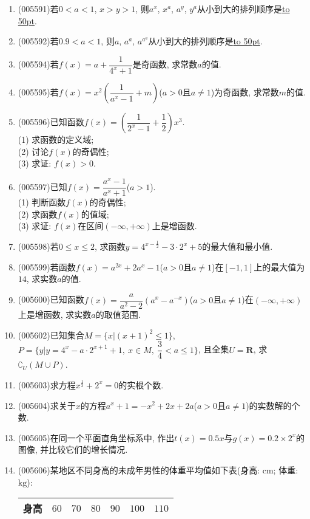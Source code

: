 \documentclass[10pt,a4paper]{article}
\newcommand{\blank}[1]{\underline{\hbox to #1pt{}}}
\begin{document}
\begin{enumerate}[1.]
\item {\tiny (005591)}若$0<a<1$, $x>y>1$, 则$a^x$, $x^a$, $a^y$, $y^a$从小到大的排列顺序是\blank{50}.
\item {\tiny (005592)}若$0.9<a<1$, 则$a$, $a^a$, $a^{a^a}$从小到大的排列顺序是\blank{50}.
\item {\tiny (005594)}若$f(x)=a+\dfrac 1{4^x+1}$是奇函数, 求常数$a$的值.
\item {\tiny (005595)}若$f(x)=x^2(\dfrac 1{a^x-1}+m)$($a>0$且$a\ne 1$)为奇函数, 求常数$m$的值.
\item {\tiny (005596)}已知函数$f(x)=(\dfrac 1{2^x-1}+\dfrac 12)x^3$.\\
(1) 求函数的定义域;\\
(2) 讨论$f(x)$的奇偶性;\\
(3) 求证: $f(x)>0$.
\item {\tiny (005597)}已知$f(x)=\dfrac{a^x-1}{a^x+1}$($a>1$).\\
(1) 判断函数$f(x)$的奇偶性;\\
(2) 求函数$f(x)$的值域;\\
(3) 求证: $f(x)$在区间$(-\infty ,+\infty)$上是增函数.
\item {\tiny (005598)}若$0\le x\le 2$, 求函数$y=4^{x-\frac 12}-3\cdot 2^x+5$的最大值和最小值.
\item {\tiny (005599)}若函数$f(x)=a^{2x}+2a^x-1$($a>0$且$a\ne 1$)在$[-1, 1]$上的最大值为$14$, 求实数$a$的值.
\item {\tiny (005600)}已知函数$f(x)=\dfrac a{a^2-2}(a^x-a^{-x})$($a>0$且$a\ne 1$)在$(-\infty ,+\infty)$上是增函数, 求实数$a$的取值范围.
\item {\tiny (005602)}已知集合$M=\{x|(x+1)^2\le 1\}$, $P=\{y|y=4^x-a\cdot 2^{x+1}+1,\ x\in M,\ \dfrac 34<a\le 1\}$, 且全集$U=\mathbf{R}$, 求$\complement _U(M\cup P)$.
\item {\tiny (005603)}求方程$x^{\frac 13}+2^x=0$的实根个数.
\item {\tiny (005604)}求关于$x$的方程$a^x+1=-x^2+2x+2a$($a>0$且$a\ne 1$)的实数解的个数.
\item {\tiny (005605)}在同一个平面直角坐标系中, 作出$t(x)=0.5x$与$g(x)=0.2\times 2^x$的图像, 并比较它们的增长情况.
\item {\tiny (005606)}某地区不同身高的未成年男性的体重平均值如下表(身高: $\text{cm}$; 体重: $\text{kg}$):
\begin{center}
    \begin{tabular}{|c|c|c|c|c|c|c|}
        \hline
        身高 & $60$ & $70$ & $80$ & $90$ & $100$ & $110$\\ \hline

\end{tabular}
\end{center}
\end{enumerate}
\end{document}
